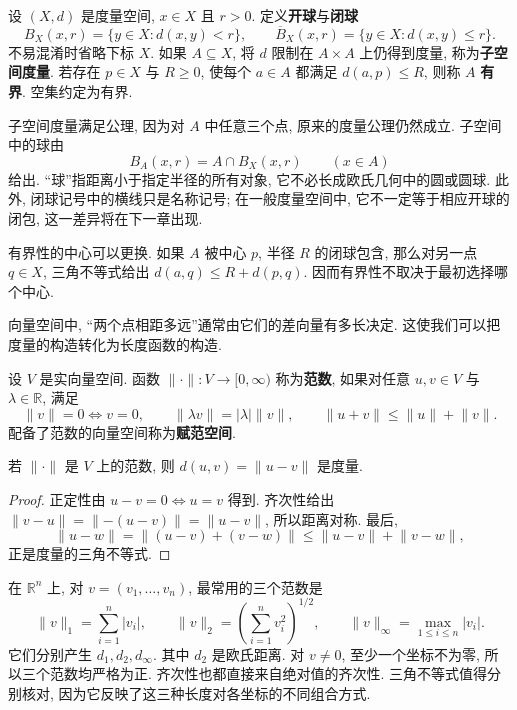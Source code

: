 \begin{definition}[球, 子空间与有界集]\label{ch:metric:balls}
设 $(X,d)$ 是度量空间, $x\in X$ 且 $r>0$. 定义\textbf{开球}与\textbf{闭球}
\[
 B_X(x,r)=\{y\in X:d(x,y)<r\},\qquad
 \overline B_X(x,r)=\{y\in X:d(x,y)\le r\}.
\]
不易混淆时省略下标 $X$. 如果 $A\subseteq X$, 将 $d$ 限制在 $A\times A$ 上仍得到度量, 称为\textbf{子空间度量}. 若存在 $p\in X$ 与 $R\ge0$, 使每个 $a\in A$ 都满足 $d(a,p)\le R$, 则称 $A$ \textbf{有界}. 空集约定为有界.
\end{definition}
子空间度量满足公理, 因为对 $A$ 中任意三个点, 原来的度量公理仍然成立. 子空间中的球由
\[
 B_A(x,r)=A\cap B_X(x,r)\qquad(x\in A)
\]
给出. ``球''指距离小于指定半径的所有对象, 它不必长成欧氏几何中的圆或圆球. 此外, 闭球记号中的横线只是名称记号; 在一般度量空间中, 它不一定等于相应开球的闭包, 这一差异将在下一章出现.

有界性的中心可以更换. 如果 $A$ 被中心 $p$, 半径 $R$ 的闭球包含, 那么对另一点 $q\in X$, 三角不等式给出 $d(a,q)\le R+d(p,q)$. 因而有界性不取决于最初选择哪个中心.

\label{ch:metric:norms}
向量空间中, ``两个点相距多远''通常由它们的差向量有多长决定. 这使我们可以把度量的构造转化为长度函数的构造.

\begin{definition}[范数]
设 $V$ 是实向量空间. 函数 $\lVert\cdot\rVert:V\to[0,\infty)$ 称为\textbf{范数}, 如果对任意 $u,v\in V$ 与 $\lambda\in\mathbb{R}$, 满足
\[
 \lVert v\rVert=0\Longleftrightarrow v=0,\qquad
 \lVert\lambda v\rVert=|\lambda|\lVert v\rVert,\qquad
 \lVert u+v\rVert\le\lVert u\rVert+\lVert v\rVert.
\]
配备了范数的向量空间称为\textbf{赋范空间}.
\end{definition}
\begin{proposition}\label{ch:metric:norm-metric}
若 $\lVert\cdot\rVert$ 是 $V$ 上的范数, 则 $d(u,v)=\lVert u-v\rVert$ 是度量.
\end{proposition}
\begin{proof}
正定性由 $u-v=0\Longleftrightarrow u=v$ 得到. 齐次性给出 $\lVert v-u\rVert=\lVert-(u-v)\rVert=\lVert u-v\rVert$, 所以距离对称. 最后,
\[
 \lVert u-w\rVert=\lVert(u-v)+(v-w)\rVert
 \le\lVert u-v\rVert+\lVert v-w\rVert,
\]
正是度量的三角不等式.
\end{proof}

在 $\mathbb{R}^n$ 上, 对 $v=(v_1,\ldots,v_n)$, 最常用的三个范数是
\[
 \lVert v\rVert_1=\sum_{i=1}^n|v_i|,\qquad
 \lVert v\rVert_2=\left(\sum_{i=1}^nv_i^2\right)^{1/2},\qquad
 \lVert v\rVert_\infty=\max_{1\le i\le n}|v_i|.
\]
它们分别产生 $d_1,d_2,d_\infty$. 其中 $d_2$ 是欧氏距离. 对 $v\ne0$, 至少一个坐标不为零, 所以三个范数均严格为正. 齐次性也都直接来自绝对值的齐次性. 三角不等式值得分别核对, 因为它反映了这三种长度对各坐标的不同组合方式.

